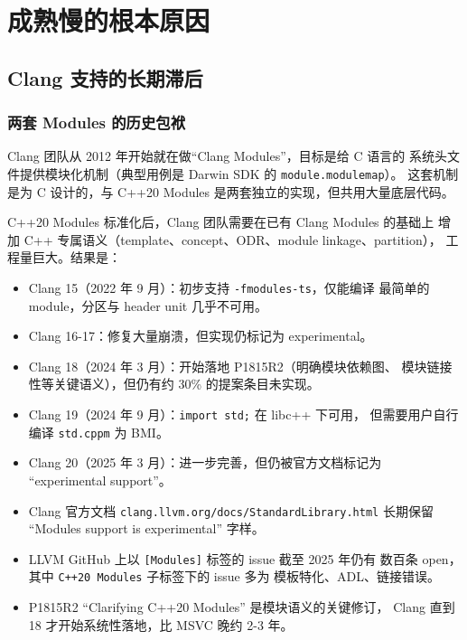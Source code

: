 \documentclass[12pt,a4paper,fontset=fandol]{ctexbook}
\newcommand{\flag}[1]{\texttt{#1}}
\begin{document}
\part{成熟慢的根本原因}

\chapter{Clang 支持的长期滞后}

\section{两套 Modules 的历史包袱}

Clang 团队从 2012 年开始就在做“Clang Modules”，目标是给 C 语言的
系统头文件提供模块化机制（典型用例是 Darwin SDK 的 \texttt{module.modulemap}）。
这套机制是为 C 设计的，与 C++20 Modules 是两套独立的实现，但共用大量底层代码。

C++20 Modules 标准化后，Clang 团队需要在已有 Clang Modules 的基础上
增加 C++ 专属语义（template、concept、ODR、module linkage、partition），
工程量巨大。结果是：

\begin{itemize}
  \item Clang 15（2022 年 9 月）：初步支持 \flag{-fmodules-ts}，仅能编译
        最简单的 module，分区与 header unit 几乎不可用。
  \item Clang 16-17：修复大量崩溃，但实现仍标记为 experimental。
  \item Clang 18（2024 年 3 月）：开始落地 P1815R2（明确模块依赖图、
        模块链接性等关键语义），但仍有约 30\% 的提案条目未实现。
  \item Clang 19（2024 年 9 月）：\flag{import std;} 在 libc++ 下可用，
        但需要用户自行编译 \texttt{std.cppm} 为 BMI。
  \item Clang 20（2025 年 3 月）：进一步完善，但仍被官方文档标记为
        “experimental support”。
\end{itemize}

\begin{evidence}[title=Clang 模块支持时间线证据]
\begin{itemize}
  \item Clang 官方文档
        \texttt{clang.llvm.org/docs/StandardLibrary.html}
        长期保留 “Modules support is experimental” 字样。
  \item LLVM GitHub 上以 \texttt{[Modules]} 标签的 issue 截至 2025 年仍有
        数百条 open，其中 \texttt{C++20 Modules} 子标签下的 issue 多为
        模板特化、ADL、链接错误。
  \item P1815R2 “Clarifying C++20 Modules” 是模块语义的关键修订，
        Clang 直到 18 才开始系统性落地，比 MSVC 晚约 2-3 年。
\end{itemize}
\end{evidence}
\end{document}

